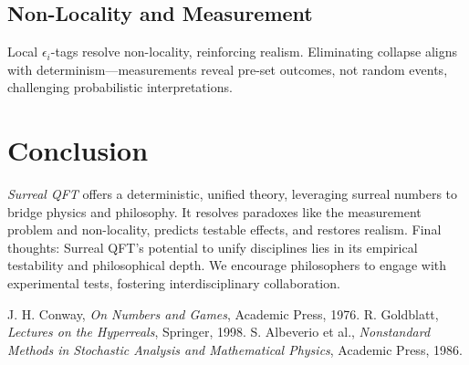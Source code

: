 \documentclass{article}
\begin{document}
\subsection{Non-Locality and Measurement}
Local \(\epsilon_i\)-tags resolve non-locality, reinforcing realism. Eliminating collapse aligns with determinism—measurements reveal pre-set outcomes, not random events, challenging probabilistic interpretations.

\section{Conclusion}
\textit{Surreal QFT} offers a deterministic, unified theory, leveraging surreal numbers to bridge physics and philosophy. It resolves paradoxes like the measurement problem and non-locality, predicts testable effects, and restores realism. Final thoughts: Surreal QFT's potential to unify disciplines lies in its empirical testability and philosophical depth. We encourage philosophers to engage with experimental tests, fostering interdisciplinary collaboration.

\begin{thebibliography}{9}
 J. H. Conway, \emph{On Numbers and Games}, Academic Press, 1976.
 R. Goldblatt, \emph{Lectures on the Hyperreals}, Springer, 1998.
 S. Albeverio et al., \emph{Nonstandard Methods in Stochastic Analysis and Mathematical Physics}, Academic Press, 1986.
\end{thebibliography}
\end{document}
